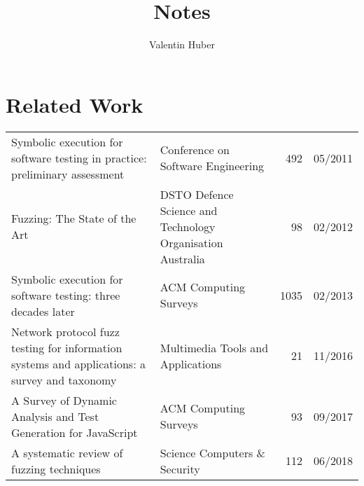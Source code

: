 \documentclass{article}
\title{Notes}
\author{Valentin Huber}
\begin{document}


\maketitle
\tableofcontents
\pagebreak

\section{Related Work}
\begin{longtable}{|P{0.44\textwidth}|P{0.32\textwidth}|r|r|}
    \hline
                                                                                                                            &                                              &  &  \\\hline
    \endhead
    Symbolic execution for software testing in practice: preliminary assessment\cite{PreliminaryAssessment}                                       & Conference on Software Engineering                         & 492            & 05/2011       \\\hline
    Fuzzing: The State of the Art\cite{FuzzingTheStateOfTheArt}                                                                                   & DSTO Defence Science and Technology Organisation Australia & 98             & 02/2012       \\\hline
    Symbolic execution for software testing: three decades later\cite{ReviewThreeDecades}                                                         & ACM Computing Surveys                                      & 1035           & 02/2013       \\\hline
    Network protocol fuzz testing for information systems and applications: a survey and taxonomy\cite{Network}                                   & Multimedia Tools and Applications                          & 21             & 11/2016       \\\hline
    A Survey of Dynamic Analysis and Test Generation for JavaScript                                                                               & ACM Computing Surveys                                      & 93             & 09/2017       \\\hline
    A systematic review of fuzzing techniques\cite{Science}                                                                                       & Science Computers \& Security                              & 112            & 06/2018       \\\hline

\end{longtable}
\end{document}
